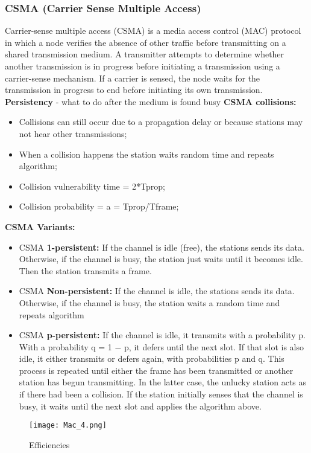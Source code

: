 \documentclass[../resumosRCOM.tex]{subfiles}
\begin{document}
\subsubsection{CSMA (Carrier Sense Multiple Access)}
Carrier-sense multiple access (CSMA) is a media access control (MAC) protocol in which a node verifies the absence of other traffic before transmitting on a shared transmission medium.
\newline
A transmitter attempts to determine whether another transmission is in progress before initiating a transmission using a carrier-sense mechanism. If a carrier is sensed, the node waits for the transmission in progress to end before initiating its own transmission.
\newline
\textbf{Persistency} - what to do after the medium is found busy
\newline
\newline
\textbf{CSMA collisions:}
\begin{itemize}
        \item Collisions can still occur due to a propagation delay or because stations may not hear other transmissions;
        \item When a collision happens the station waits random time and repeats algorithm;
        \item Collision vulnerability time = 2*Tprop;
        \item Collision probability = a = Tprop/Tframe;
\end{itemize}
\newline
\newline
\textbf{CSMA Variants:}
\begin{itemize}
        \item CSMA \textbf {1-persistent:} If the channel is idle (free), the stations sends its data. Otherwise, if the channel is busy, the station just waits until it becomes idle. Then the station transmits a frame.
        \item CSMA \textbf {Non-persistent:} If the channel is idle, the stations sends its data. Otherwise, if the channel is busy, the station waits a random time and repeats algorithm
        \item CSMA \textbf {p-persistent:} If the channel is idle, it transmits with a probability p. With a probability q = 1 − p, it defers until the next slot. If that slot is also idle, it either transmits or defers again, with probabilities p and q. This process is repeated until either the frame has been transmitted or another station has begun transmitting. In the latter case, the unlucky station acts as if there had been a collision. If the station initially senses that the channel is busy, it waits until the next slot and applies the algorithm above.
\end{itemize}
\begin{figure}[H]
    \centering
    \texttt{[image: Mac\_4.png]}
    \caption{Efficiencies}
\end{figure}
\end{document}
